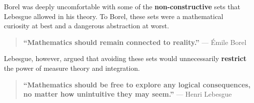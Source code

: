 Borel was deeply uncomfortable with some of the \textbf{non-constructive} sets that Lebesgue allowed in his theory. To Borel, these sets were a mathematical curiosity at best and a dangerous abstraction at worst.

\begin{quote}
\textbf{“Mathematics should remain connected to reality.”} — Émile Borel
\end{quote}

Lebesgue, however, argued that avoiding these sets would unnecessarily \textbf{restrict} the power of measure theory and integration.

\begin{quote}
\textbf{“Mathematics should be free to explore any logical consequences, no matter how unintuitive they may seem.”} — Henri Lebesgue
\end{quote}




